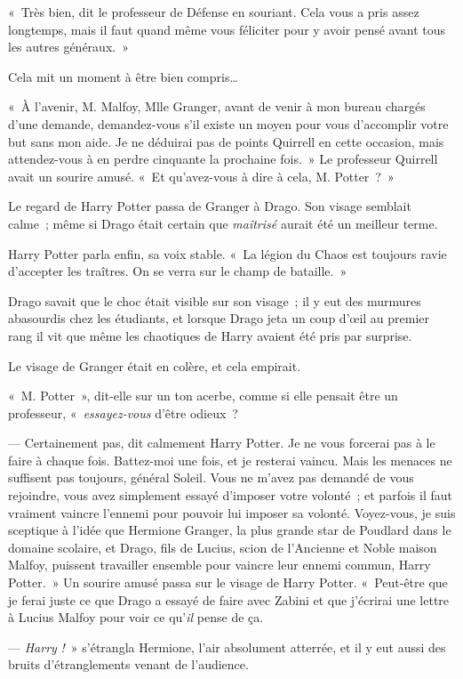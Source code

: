 «~Très bien, dit le professeur de Défense en souriant. Cela vous a pris assez longtemps, mais il faut quand même vous féliciter pour y avoir pensé avant tous les autres généraux.~»

Cela mit un moment à être bien compris…

«~À l'avenir, M. Malfoy, Mlle Granger, avant de venir à mon bureau chargés d'une demande, demandez-vous s'il existe un moyen pour vous d'accomplir votre but sans mon aide. Je ne déduirai pas de points Quirrell en cette occasion, mais attendez-vous à en perdre cinquante la prochaine fois.~» Le professeur Quirrell avait un sourire amusé. «~Et qu'avez-vous à dire à cela, M. Potter~?~»

Le regard de Harry Potter passa de Granger à Drago. Son visage semblait calme~; même si Drago était certain que \emph{maîtrisé} aurait été un meilleur terme.

Harry Potter parla enfin, sa voix stable. «~La légion du Chaos est toujours ravie d'accepter les traîtres. On se verra sur le champ de bataille.~»

Drago savait que le choc était visible sur son visage~; il y eut des murmures abasourdis chez les étudiants, et lorsque Drago jeta un coup d'œil au premier rang il vit que même les chaotiques de Harry avaient été pris par surprise.

Le visage de Granger était en colère, et cela empirait.

«~M. Potter~», dit-elle sur un ton acerbe, comme si elle pensait être un professeur, «~\emph{essayez-vous} d'être odieux~?

--- Certainement pas, dit calmement Harry Potter. Je ne vous forcerai pas à le faire à chaque fois. Battez-moi une fois, et je resterai vaincu. Mais les menaces ne suffisent pas toujours, général Soleil. Vous ne m'avez pas demandé de vous rejoindre, vous avez simplement essayé d'imposer votre volonté~; et parfois il faut vraiment vaincre l'ennemi pour pouvoir lui imposer sa volonté. Voyez-vous, je suis sceptique à l'idée que Hermione Granger, la plus grande star de Poudlard dans le domaine scolaire, et Drago, fils de Lucius, scion de l'Ancienne et Noble maison Malfoy, puissent travailler ensemble pour vaincre leur ennemi commun, Harry Potter.~» Un sourire amusé passa sur le visage de Harry Potter. «~Peut-être que je ferai juste ce que Drago a essayé de faire avec Zabini et que j'écrirai une lettre à Lucius Malfoy pour voir ce qu'\emph{il} pense de ça.

--- \emph{Harry} \emph{!}~» s'étrangla Hermione, l'air absolument atterrée, et il y eut aussi des bruits d'étranglements venant de l'audience.

